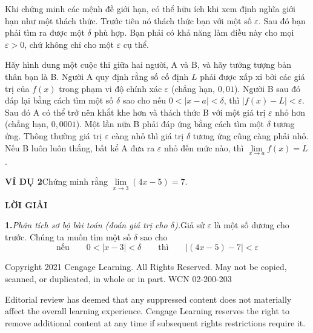 \begin{minipage}[t]{385pt}
  Khi chứng minh các mệnh đề giới hạn, có thể hữu ích khi xem định nghĩa giới hạn như một thách thức. Trước tiên nó thách thức bạn với một số $\varepsilon$. Sau đó bạn phải tìm ra được một $\delta$ phù hợp. Bạn phải có khả năng làm điều này cho mọi $\varepsilon > 0$, chứ không chỉ cho một $\varepsilon$ cụ thể.

  Hãy hình dung một cuộc thi giữa hai người, A và B, và hãy tưởng tượng bản thân bạn là B. Người A quy định rằng số cố định $L$ phải được xấp xỉ bởi các giá trị của $f(x)$ trong phạm vi độ chính xác $\varepsilon$ (chẳng hạn, $0{,}01$). Người B sau đó đáp lại bằng cách tìm một số $\delta$ sao cho nếu $0 < |x - a| < \delta$, thì $|f(x) - L| < \varepsilon$. Sau đó A có thể trở nên khắt khe hơn và thách thức B với một giá trị $\varepsilon$ nhỏ hơn (chẳng hạn, $0{,}0001$). Một lần nữa B phải đáp ứng bằng cách tìm một $\delta$ tương ứng. Thông thường giá trị $\varepsilon$ càng nhỏ thì giá trị $\delta$ tương ứng cũng càng phải nhỏ. Nếu B luôn luôn thắng, bất kể A đưa ra $\varepsilon$ nhỏ đến mức nào, thì $\lim\limits_{x \to a} f(x) = L$.

  \vspace{7pt}
  \noindent
  \textbf{\textsf{\color{stewartblue}VÍ DỤ 2}}\quad Chứng minh rằng $\lim\limits_{x \to 3} (4x - 5) = 7$.

  \vspace{3pt}
  \noindent
  \textbf{\textsf{\color{stewartblue}LỜI GIẢI}}

  \vspace{1pt}
  \noindent
  \textbf{1.}\enspace \textit{Phân tích sơ bộ bài toán (đoán giá trị cho $\delta$).}\enspace Giả sử $\varepsilon$ là một số dương cho trước. Chúng ta muốn tìm một số $\delta$ sao cho
  \[
    \text{nếu}\qquad 0 < |x - 3| < \delta \qquad\text{thì}\qquad |(4x - 5) - 7| < \varepsilon
  \]
\end{minipage}

\vfill
\noindent
\begin{minipage}{\textwidth}
  \raggedright
  \fontsize{6.5}{8}\selectfont\color{black!60}
  Copyright 2021 Cengage Learning. All Rights Reserved. May not be copied, scanned, or duplicated, in whole or in part. WCN 02-200-203\par
  Editorial review has deemed that any suppressed content does not materially affect the overall learning experience. Cengage Learning reserves the right to remove additional content at any time if subsequent rights restrictions require it.
\end{minipage}
